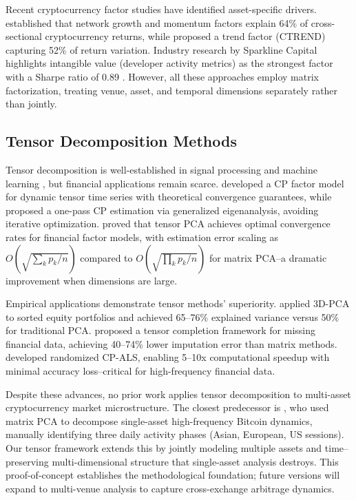 \documentclass[11pt,twocolumn]{article}
\begin{document}
Recent cryptocurrency factor studies have identified asset-specific drivers. \citet{Liu2021Risks} established that network growth and momentum factors explain 64\% of cross-sectional cryptocurrency returns, while \citet{Fieberg2023CTREND} proposed a trend factor (CTREND) capturing 52\% of return variation. Industry research by Sparkline Capital highlights intangible value (developer activity metrics) as the strongest factor with a Sharpe ratio of 0.89 \citep{Sparkline2025IntangibleValue}. However, all these approaches employ matrix factorization, treating venue, asset, and temporal dimensions separately rather than jointly.

\subsection{Tensor Decomposition Methods}

Tensor decomposition is well-established in signal processing and machine learning \citep{Kolda2009Tensor,Cichocki2015Tensor}, but financial applications remain scarce. \citet{Han2022CP} developed a CP factor model for dynamic tensor time series with theoretical convergence guarantees, while \citet{Chang2023Modelling} proposed a one-pass CP estimation via generalized eigenanalysis, avoiding iterative optimization. \citet{Babii2023Tensor} proved that tensor PCA achieves optimal convergence rates for financial factor models, with estimation error scaling as $O(\sqrt{\sum_k p_k / n})$ compared to $O(\sqrt{\prod_k p_k / n})$ for matrix PCA--a dramatic improvement when dimensions are large.

Empirical applications demonstrate tensor methods' superiority. \citet{Lettau2024ThreeD} applied 3D-PCA to sorted equity portfolios and achieved 65--76\% explained variance versus 50\% for traditional PCA. \citet{Mo2025ACT} proposed a tensor completion framework for missing financial data, achieving 40--74\% lower imputation error than matrix methods. \citet{Battaglino2018Practical} developed randomized CP-ALS, enabling 5--10x computational speedup with minimal accuracy loss--critical for high-frequency financial data.

Despite these advances, no prior work applies tensor decomposition to multi-asset cryptocurrency market microstructure. The closest predecessor is \citet{Watorek2023Decomposing}, who used matrix PCA to decompose single-asset high-frequency Bitcoin dynamics, manually identifying three daily activity phases (Asian, European, US sessions). Our tensor framework extends this by jointly modeling multiple assets and time--preserving multi-dimensional structure that single-asset analysis destroys. This proof-of-concept establishes the methodological foundation; future versions will expand to multi-venue analysis to capture cross-exchange arbitrage dynamics.
\end{document}
